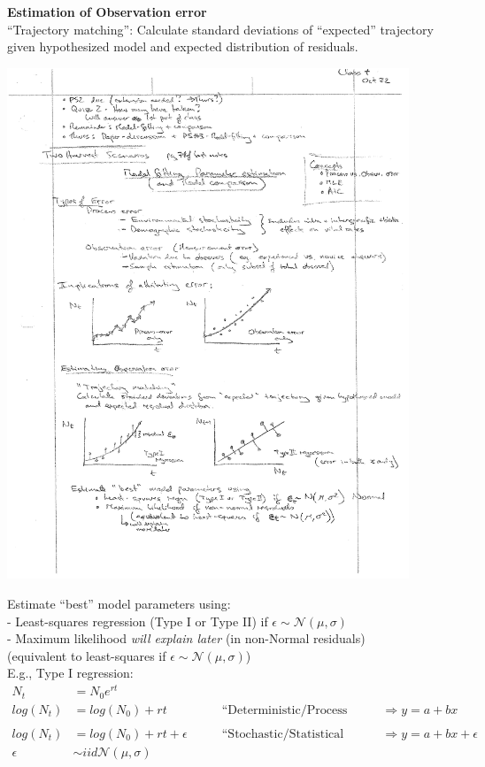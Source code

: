 \documentclass{article}
\newcommand{\ind}{\-\hspace{1cm}}
\begin{document}
\textbf{Estimation of Observation error}\\
``Trajectory matching'': 
Calculate standard deviations of ``expected'' trajectory given hypothesized model and expected distribution of residuals.

\begin{center}
	\includegraphics[width=12cm]{figs/image1.pdf}
\end{center}

Estimate ``best'' model parameters using:\\
\ind - Least-squares regression (Type I or Type II) if $\epsilon \sim \mathcal{N}(\mu, \sigma)$\\
\ind - Maximum likelihood \emph{will explain later} (in non-Normal residuals)\\
\ind \ind \ind (equivalent to least-squares if $\epsilon \sim \mathcal{N}(\mu, \sigma)$)\\

E.g., Type I regression:\\
\begin{align*}
	N_t &= N_0 e^{rt}\\
	log(N_t) & = log(N_0)+rt \quad \quad &\text{``Deterministic/Process model''} \quad \quad  &\Rightarrow y=a + bx\\
	\\
	log(N_t) & = log(N_0)+rt+\epsilon \quad \quad &\text{``Stochastic/Statistical model''} \quad \quad &\Rightarrow y=a + bx + \epsilon \\
	\epsilon &\sim iid \mathcal{N}(\mu,\sigma)
\end{align*}
\end{document}
